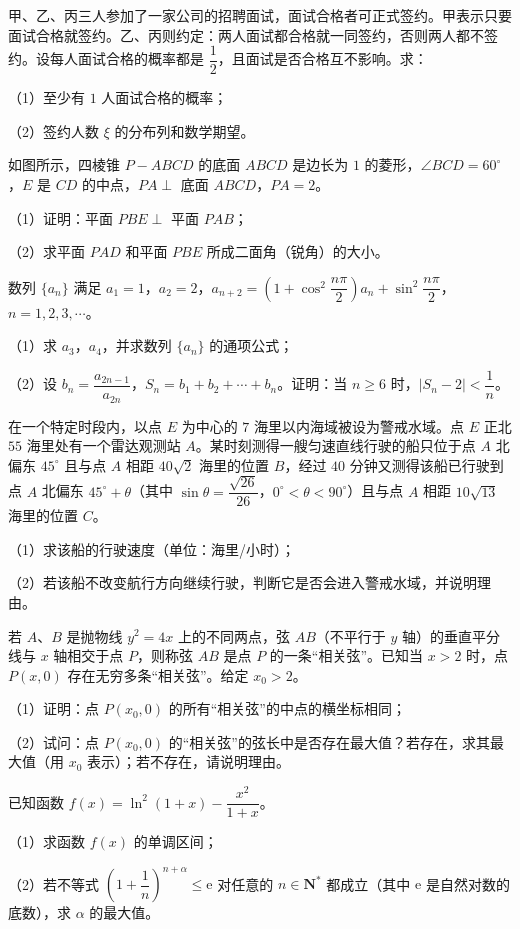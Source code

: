 \begin{question}
甲、乙、丙三人参加了一家公司的招聘面试，面试合格者可正式签约。甲表示只要面试合格就签约。乙、丙则约定：两人面试都合格就一同签约，否则两人都不签约。设每人面试合格的概率都是 $\dfrac12$，且面试是否合格互不影响。求：

（1）至少有 $1$ 人面试合格的概率；

（2）签约人数 $\xi$ 的分布列和数学期望。

\Needspace{0.4\textheight}
\end{question}
\begin{question}
如图所示，四棱锥 $P-ABCD$ 的底面 $ABCD$ 是边长为 $1$ 的菱形，$\angle BCD=60^\circ$，$E$ 是 $CD$ 的中点，$PA\perp$ 底面 $ABCD$，$PA=2$。

（1）证明：平面 $PBE\perp$ 平面 $PAB$；

（2）求平面 $PAD$ 和平面 $PBE$ 所成二面角（锐角）的大小。
\nopagebreak[4]
\begin{center}\end{center}
\nopagebreak[4]
\end{question}
\begin{question}
数列 $\{a_n\}$ 满足 $a_1=1$，$a_2=2$，$a_{n+2}=\left(1+\cos^2\dfrac{n\pi}2\right)a_n+\sin^2\dfrac{n\pi}2$，$n=1,2,3,\cdots$。

（1）求 $a_3$，$a_4$，并求数列 $\{a_n\}$ 的通项公式；

（2）设 $b_n=\dfrac{a_{2n-1}}{a_{2n}}$，$S_n=b_1+b_2+\cdots+b_n$。证明：当 $n\geqslant6$ 时，$|S_n-2|<\dfrac1n$。

\end{question}
\begin{question}
在一个特定时段内，以点 $E$ 为中心的 $7$ 海里以内海域被设为警戒水域。点 $E$ 正北 $55$ 海里处有一个雷达观测站 $A$。某时刻测得一艘匀速直线行驶的船只位于点 $A$ 北偏东 $45^\circ$ 且与点 $A$ 相距 $40\sqrt2$ 海里的位置 $B$，经过 $40$ 分钟又测得该船已行驶到点 $A$ 北偏东 $45^\circ+\theta$（其中 $\sin\theta=\dfrac{\sqrt{26}}{26}$，$0^\circ<\theta<90^\circ$）且与点 $A$ 相距 $10\sqrt{13}$ 海里的位置 $C$。

（1）求该船的行驶速度（单位：海里/小时）；

（2）若该船不改变航行方向继续行驶，判断它是否会进入警戒水域，并说明理由。

\end{question}
\begin{question}
若 $A$、$B$ 是抛物线 $y^2=4x$ 上的不同两点，弦 $AB$（不平行于 $y$ 轴）的垂直平分线与 $x$ 轴相交于点 $P$，则称弦 $AB$ 是点 $P$ 的一条“相关弦”。已知当 $x>2$ 时，点 $P(x,0)$ 存在无穷多条“相关弦”。给定 $x_0>2$。

（1）证明：点 $P(x_0,0)$ 的所有“相关弦”的中点的横坐标相同；

（2）试问：点 $P(x_0,0)$ 的“相关弦”的弦长中是否存在最大值？若存在，求其最大值（用 $x_0$ 表示）；若不存在，请说明理由。

\end{question}
\begin{question}
已知函数 $f(x)=\ln^2(1+x)-\dfrac{x^2}{1+x}$。

（1）求函数 $f(x)$ 的单调区间；

（2）若不等式 $\left(1+\dfrac1n\right)^{n+\alpha}\leqslant\mathrm e$ 对任意的 $n\in\mathbf N^*$ 都成立（其中 $\mathrm e$ 是自然对数的底数），求 $\alpha$ 的最大值。

\end{question}